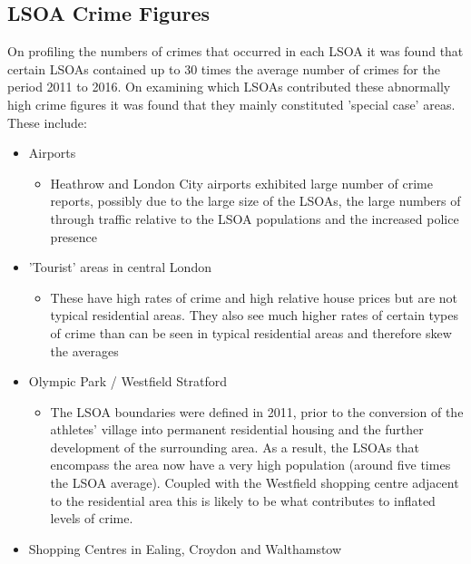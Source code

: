 \documentclass{article}
\begin{document}
\subsection{LSOA Crime Figures}
On profiling the numbers of crimes that occurred in each LSOA it was found that certain LSOAs contained up to 30 times the average number of crimes for the period 2011 to 2016. On examining which LSOAs contributed these abnormally high crime figures it was found that they mainly constituted 'special case' areas. These include:
\begin{itemize}
\item Airports
\begin{itemize}
\item Heathrow and London City airports exhibited large number of crime reports, possibly due to the large size of the LSOAs, the large numbers of through traffic relative to the LSOA populations and the increased police presence
\end{itemize}

\item 'Tourist' areas in central London
\begin{itemize}
\item These have high rates of crime and high relative house prices but are not typical residential areas. They also see much higher rates of certain types of crime than can be seen in typical residential areas and therefore skew the averages
\end{itemize}

\item Olympic Park / Westfield Stratford
\begin{itemize}
\item The LSOA boundaries were defined in 2011, prior to the conversion of the athletes' village into permanent residential housing and the further development of the surrounding area. As a result, the LSOAs that encompass the area now have a very high population (around five times the LSOA average). Coupled with the Westfield shopping centre adjacent to the residential area this is likely to be what contributes to inflated levels of crime.
\end{itemize}

\item Shopping Centres in Ealing, Croydon and Walthamstow

\end{itemize}
\bigskip
\end{document}
